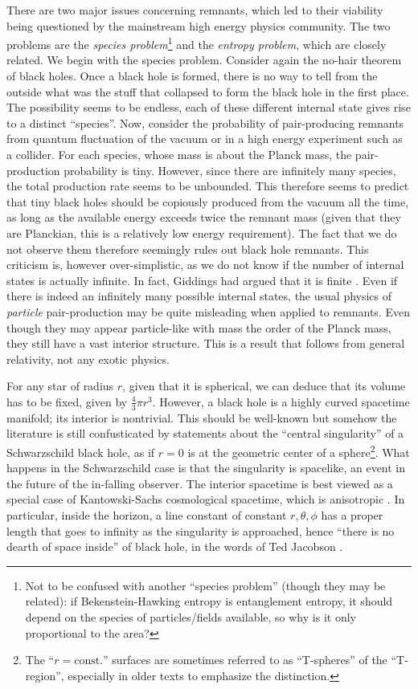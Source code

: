 \documentclass[preprintnumbers, floatfix, preprintnumbers, letterpaper, twocolumn, superscriptaddress,nofootinbib]{revtex4-2}
\begin{document}
There are two major issues concerning remnants, which led to their viability being questioned by the mainstream high energy physics community. The two problems are the \emph{species problem}\footnote{Not to be confused with another ``species problem'' \cite{9409015,1206.2365} (though they may be related): if Bekenstein-Hawking entropy is entanglement entropy, it should depend on the species of particles/fields available, so why is it only proportional to the area?} and the \emph{entropy problem}, which are closely related. We begin with the species problem. Consider again the no-hair theorem of black holes. Once a black hole is formed, there is no way to tell from the outside what was the stuff that collapsed to form the black hole in the first place. The possibility seems to be endless, each of these different internal state gives rise to a distinct ``species''. Now, consider the probability of pair-producing remnants from quantum fluctuation of the vacuum or in a high energy experiment such as a collider. For each species, whose mass is about the Planck mass, the pair-production probability is tiny. However, since there are infinitely many species, the total production rate seems to be unbounded. This therefore seems to predict that tiny black holes should be copiously produced from the vacuum all the time, as long as the available energy exceeds twice the remnant mass (given that they are Planckian, this is a relatively low energy requirement). The fact that we do not observe them therefore seemingly rules out black hole remnants. This criticism is, however over-simplistic, as we do not know if the number of internal states is actually infinite. In fact, Giddings had argued that it is finite \cite{9310101,9412159}. Even if there is indeed an infinitely many possible internal states, the usual physics of \emph{particle} pair-production may be quite misleading when applied to remnants. Even though they may appear particle-like with mass the order of the Planck mass, they still have a vast interior structure. This is a result that follows from general relativity, not any exotic physics. 

For any star of radius $r$, given that it is spherical, we can deduce that its volume has to be fixed, given by $\frac{4}{3}\pi r^3$. However, a black hole is a highly curved spacetime manifold; its interior is nontrivial. This should be well-known but somehow the literature is still confusticated by statements about the ``central singularity'' of a Schwarzschild black hole, as if $r=0$ is at the geometric center of a sphere\footnote{The ``$r=\text{const.}$'' surfaces are sometimes referred to as ``T-spheres'' of the ``T-region'', especially in older texts \cite{ruban} to emphasize the distinction.}. What happens in the Schwarzschild case is that the singularity is spacelike, an event in the future of the in-falling observer. The interior spacetime is best viewed as a special case of Kantowski-Sachs cosmological spacetime, which is anisotropic \cite{0609042, brehme}. In particular, inside the horizon, a line constant of constant $r, \theta, \phi$ has a proper length that goes to infinity as the singularity is approached, hence ``there is no dearth of space inside'' of black hole, in the words of Ted Jacobson \cite{0308048}.
\end{document}

